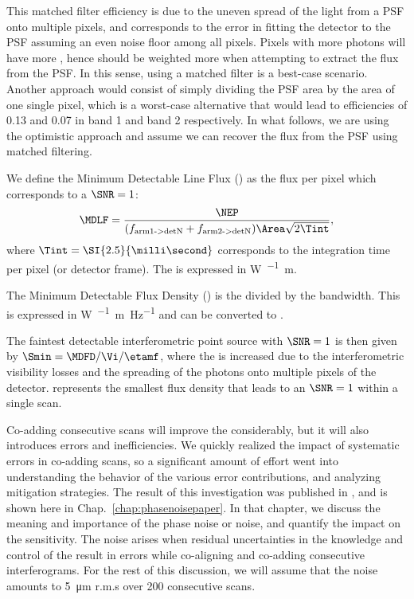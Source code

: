 This matched filter efficiency is due to the uneven spread of the light from a PSF onto multiple pixels, and corresponds to the error in fitting the detector to the PSF assuming an even noise floor among all pixels. Pixels with more photons will have more \SNR, hence should be weighted more when attempting to extract the flux from the PSF. In this sense, using a matched filter is a best-case scenario. Another approach would consist of simply dividing the PSF area by the area of one single pixel, which is a worst-case alternative that would lead to efficiencies of 0.13 and 0.07 in band 1 and band 2 respectively. In what follows, we are using the optimistic approach and assume we can recover the flux from the PSF using matched filtering. 

We define the Minimum Detectable Line Flux (\MDLF) as the flux per pixel which corresponds to a $\SNR = 1$:
\begin{align}
\MDLF = \frac{\NEP}{(f_\textrm{arm1->detN}+ f_\textrm{arm2->detN})\Area\sqrt{2\Tint}},
\end{align}
where $\Tint = \SI{2.5}{\milli\second}$ corresponds to the integration time per pixel (or detector frame). The \MDLF is expressed in \si{\watt\per{}\meter}.

The Minimum Detectable Flux Density (\MDFD) is the \MDLF divided by the bandwidth. This is expressed in \si{\watt\per{}\meter\per\hertz} and can be converted to \si{\jansky}.

The faintest detectable interferometric point source with $\SNR = 1$ is then given by $\Smin= \MDFD/\Vi/\etamf$, where the \MDFD is increased due to the interferometric visibility losses and the spreading of the photons onto multiple pixels of the detector. \Smin represents the smallest flux density that leads to an $\SNR = 1$ within a single scan.

Co-adding consecutive scans will improve the \SNR considerably, but it will also introduces errors and inefficiencies. We quickly realized the impact of systematic errors in co-adding scans, so a significant amount of effort went into understanding the behavior of the various error contributions, and analyzing mitigation strategies. The result of this investigation was published in \citet{Rizzo:2015gf}, and is shown here in Chap.~\ref{chap:phasenoisepaper}. In that chapter, we discuss the meaning and importance of the phase noise or \OPD noise, and quantify the impact on the sensitivity. The \OPD noise arises when residual uncertainties in the knowledge and control of the \OPD result in errors while co-aligning and co-adding consecutive interferograms. For the rest of this discussion, we will assume that the \OPD noise amounts to \SI{5}{\micro\meter} r.m.s over 200 consecutive scans.

